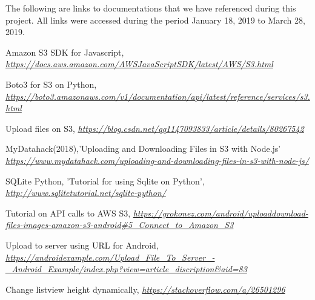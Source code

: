 \newline 
The following are links to documentations that we have referenced during this project. All links were accessed during the period January 18, 2019 to March 28, 2019.

\begin{thebibliography}{9}

Amazon S3 SDK for Javascript,
\textit{\url{https://docs.aws.amazon.com/AWSJavaScriptSDK/latest/AWS/S3.html}}

Boto3 for S3 on Python,
\textit{\url{https://boto3.amazonaws.com/v1/documentation/api/latest/reference/services/s3.html}}

Upload files on S3,
\textit{\url{https://blog.csdn.net/qq1147093833/article/details/80267542}}

MyDatahack(2018),'Uploading and Downloading Files in S3 with Node.js'
\textit{\url{https://www.mydatahack.com/uploading-and-downloading-files-in-s3-with-node-js/}}

SQLite Python, 'Tutorial for using Sqlite on Python',
\textit{\url{http://www.sqlitetutorial.net/sqlite-python/}}

Tutorial on API calls to AWS S3,
\textit{\url{https://grokonez.com/android/uploaddownload-files-images-amazon-s3-android#5_Connect_to_Amazon_S3}}

Upload to server using URL for Android,
\textit{\url{https://androidexample.com/Upload_File_To_Server_-_Android_Example/index.php?view=article_discription&aid=83}}

Change listview height dynamically,
\textit{\url{https://stackoverflow.com/a/26501296}}

\end{thebibliography}
